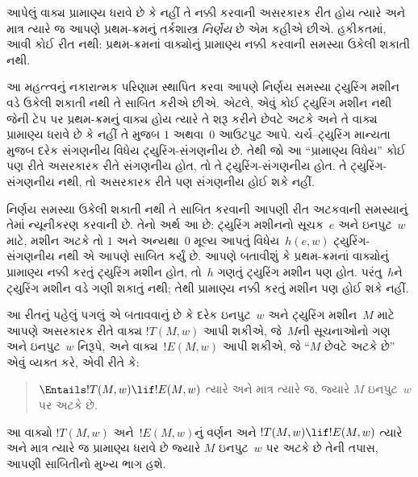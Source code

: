 આપેલું વાક્ય પ્રામાણ્ય ધરાવે છે કે નહીં તે
નક્કી કરવાની અસરકારક રીત હોય ત્યારે અને માત્ર ત્યારે
જ આપણે પ્રથમ-ક્રમનું તર્કશાસ્ત્ર \emph{નિર્ણેય} છે એમ
કહીએ છીએ. હકીકતમાં, આવી કોઈ રીત નથી: પ્રથમ-ક્રમનાં
વાક્યોનું પ્રામાણ્ય નક્કી કરવાની સમસ્યા ઉકેલી શકાતી નથી.

આ મહત્ત્વનું નકારાત્મક પરિણામ સ્થાપિત કરવા આપણે
નિર્ણય સમસ્યા ટ્યુરિંગ મશીન વડે ઉકેલી શકાતી નથી તે
સાબિત કરીએ છીએ. એટલે, એવું કોઈ ટ્યુરિંગ મશીન નથી
જેની ટેપ પર પ્રથમ-ક્રમનું વાક્ય હોય ત્યારે
તે શરૂ કરીને છેવટે અટકે અને તે વાક્ય પ્રામાણ્ય ધરાવે
છે કે નહીં તે મુજબ $1$ અથવા~$0$ આઉટપુટ આપે.
ચર્ચ--ટ્યુરિંગ માન્યતા મુજબ દરેક સંગણનીય વિધેય
ટ્યુરિંગ-સંગણનીય છે. તેથી જો આ ``પ્રામાણ્ય વિધેય''
કોઈ પણ રીતે અસરકારક રીતે સંગણનીય હોત, તો તે
ટ્યુરિંગ-સંગણનીય હોત. તે ટ્યુરિંગ-સંગણનીય નથી,
તો અસરકારક રીતે પણ સંગણનીય હોઈ શકે નહીં.

નિર્ણય સમસ્યા ઉકેલી શકાતી નથી તે સાબિત કરવાની
આપણી રીત અટકવાની સમસ્યાનું તેમાં ન્યૂનીકરણ કરવાની
છે. તેનો અર્થ આ છે: ટ્યુરિંગ મશીનનો સૂચક~$e$
અને ઇનપુટ~$w$ માટે, મશીન અટકે તો $1$ અને
અન્યથા~$0$ મૂલ્ય આપતું વિધેય~$h(e,w)$ ટ્યુરિંગ-સંગણનીય
નથી એ આપણે સાબિત કર્યું છે. આપણે બતાવીશું કે
પ્રથમ-ક્રમનાં વાક્યોનું પ્રામાણ્ય નક્કી કરતું ટ્યુરિંગ
મશીન હોત, તો~$h$ ગણતું ટ્યુરિંગ મશીન પણ હોત.
પરંતુ~$h$ને ટ્યુરિંગ મશીન વડે ગણી શકાતું નથી;
તેથી પ્રામાણ્ય નક્કી કરતું મશીન પણ હોઈ શકે નહીં.

આ રીતનું પહેલું પગલું એ બતાવવાનું છે કે દરેક ઇનપુટ~$w$
અને ટ્યુરિંગ મશીન~$M$ માટે આપણે અસરકારક રીતે
વાક્ય $!T(M, w)$ આપી શકીએ, જે~$M$ની
સૂચનાઓનો ગણ અને ઇનપુટ~$w$ નિરૂપે, અને
વાક્ય~$!E(M, w)$ આપી શકીએ, જે ``$M$ છેવટે
અટકે છે'' એવું વ્યક્ત કરે, એવી રીતે કે:
\begin{quote}
  $\Entails !T(M, w) \lif !E(M,w)$ ત્યારે અને માત્ર
  ત્યારે જ, જ્યારે $M$ ઇનપુટ~$w$ પર અટકે છે.
\end{quote}
આ વાક્યો $!T(M, w)$ અને~$!E(M, w)$નું વર્ણન અને
$!T(M, w) \lif !E(M, w)$ ત્યારે અને માત્ર ત્યારે જ
પ્રામાણ્ય ધરાવે છે જ્યારે $M$ ઇનપુટ~$w$ પર અટકે
છે તેની તપાસ, આપણી સાબિતીનો મુખ્ય ભાગ હશે.
\endgroup


\begingroup
\makeatletter{}\makeatother

\label{guunit:OLP-0270}


